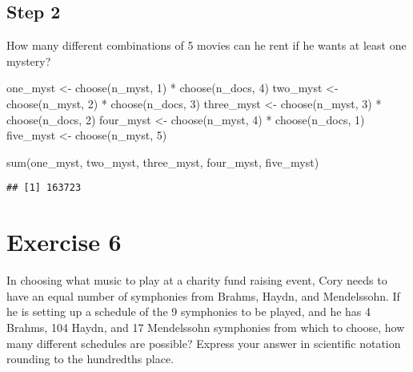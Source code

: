 \documentclass[
]{article}
\newenvironment{Shaded}{\begin{snugshade}}{\end{snugshade}}
\newcommand{\DecValTok}[1]{\textcolor[rgb]{0.00,0.00,0.81}{#1}}
\newcommand{\FunctionTok}[1]{\textcolor[rgb]{0.00,0.00,0.00}{#1}}
\newcommand{\NormalTok}[1]{#1}
\newcommand{\OtherTok}[1]{\textcolor[rgb]{0.56,0.35,0.01}{#1}}
\newcommand{\SpecialCharTok}[1]{\textcolor[rgb]{0.00,0.00,0.00}{#1}}
\begin{document}
\hypertarget{step-2}{%
\subsection{Step 2}\label{step-2}}

How many different combinations of 5 movies can he rent if he wants at
least one mystery?

\begin{Shaded}
\begin{Highlighting}[]
\NormalTok{one\_myst }\OtherTok{\textless{}{-}} \FunctionTok{choose}\NormalTok{(n\_myst, }\DecValTok{1}\NormalTok{) }\SpecialCharTok{*} \FunctionTok{choose}\NormalTok{(n\_docs, }\DecValTok{4}\NormalTok{)}
\NormalTok{two\_myst }\OtherTok{\textless{}{-}} \FunctionTok{choose}\NormalTok{(n\_myst, }\DecValTok{2}\NormalTok{) }\SpecialCharTok{*} \FunctionTok{choose}\NormalTok{(n\_docs, }\DecValTok{3}\NormalTok{)}
\NormalTok{three\_myst }\OtherTok{\textless{}{-}} \FunctionTok{choose}\NormalTok{(n\_myst, }\DecValTok{3}\NormalTok{) }\SpecialCharTok{*} \FunctionTok{choose}\NormalTok{(n\_docs, }\DecValTok{2}\NormalTok{)}
\NormalTok{four\_myst }\OtherTok{\textless{}{-}} \FunctionTok{choose}\NormalTok{(n\_myst, }\DecValTok{4}\NormalTok{) }\SpecialCharTok{*} \FunctionTok{choose}\NormalTok{(n\_docs, }\DecValTok{1}\NormalTok{)}
\NormalTok{five\_myst }\OtherTok{\textless{}{-}} \FunctionTok{choose}\NormalTok{(n\_myst, }\DecValTok{5}\NormalTok{)}

\FunctionTok{sum}\NormalTok{(one\_myst, two\_myst, three\_myst, four\_myst, five\_myst)}
\end{Highlighting}
\end{Shaded}

\begin{verbatim}
## [1] 163723
\end{verbatim}

\hypertarget{exercise-6}{%
\section{Exercise 6}\label{exercise-6}}

In choosing what music to play at a charity fund raising event, Cory
needs to have an equal number of symphonies from Brahms, Haydn, and
Mendelssohn. If he is setting up a schedule of the 9 symphonies to be
played, and he has 4 Brahms, 104 Haydn, and 17 Mendelssohn symphonies
from which to choose, how many different schedules are possible? Express
your answer in scientific notation rounding to the hundredths place.
\end{document}
